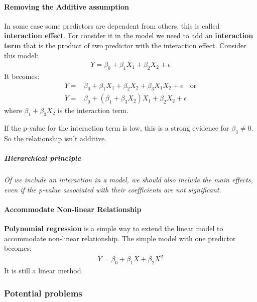 \documentclass[a4paper]{article}
\begin{document}
							\paragraph{Removing the Additive assumption}
								In some case some predictors are dependent from others, this is called \textbf{interaction effect}. For consider it in the model we need to add an \textbf{interaction term} that is the product of two predictor with the interaction effect. Consider this model:
								\begin{align*}
									Y = \beta_0 + \beta_1 X_1 + \beta_2 X_2 + \epsilon
								\end{align*}
								It becomes:
								\begin{align*}
									Y ={} & \beta_0 + \beta_1 X_1 + \beta_2 X_2 + \beta_3 X_1 X_2 + \epsilon \quad \text{or} \\
									Y ={} & \beta_0 + (\beta_1 + \beta_3 X_2) X_1 + \beta_2 X_2 + \epsilon
								\end{align*}
								where $\beta_1 + \beta_3 X_2$ is the interaction term.
								
								If the p-value for the interaction term is low, this is a strong evidence for $\beta_3 \neq 0$. So the relationship isn't additive.	
								
								\subparagraph{Hierarchical principle} \textit{Of we include an interaction in a model, we should also include the main effects, even if the p-value associated with their coefficients are not significant.}							
								
							
							\paragraph{Accommodate Non-linear Relationship}																\textbf{Polynomial regression} is a simple way to extend the linear model to accommodate non-linear relationship.
								The simple model with one predictor becomes:
								\begin{align*}
									Y = \beta_0 + \beta_1 X + \beta_2 X^2
								\end{align*}
								It is still a linear method.
						
					\subsubsection{Potential problems}
						
\end{document}
